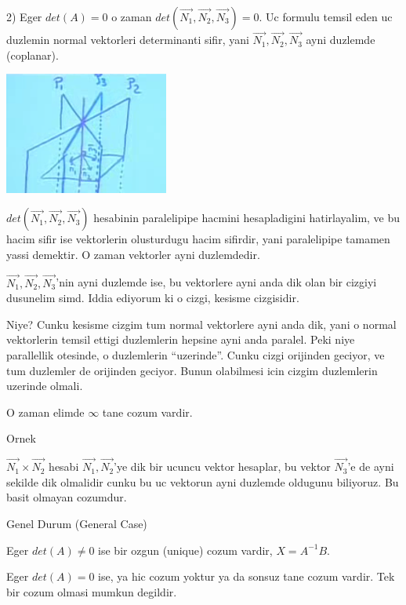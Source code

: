 \documentclass[12pt,fleqn]{article}
\begin{document}
2) Eger $det(A) = 0$ o zaman $det(\vec{N_1},\vec{N_2},\vec{N_3}) = 0$. Uc formulu temsil  
eden uc duzlemin normal vektorleri determinanti sifir, yani
$\vec{N_1},\vec{N_2},\vec{N_3}$ ayni duzlemde (coplanar). 

\includegraphics[height=4cm]{4_5.png}

$det(\vec{N_1},\vec{N_2},\vec{N_3})$ hesabinin paralelipipe hacmini hesapladigini hatirlayalim, ve 
bu hacim sifir ise vektorlerin olusturdugu hacim sifirdir, yani paralelipipe 
tamamen yassi demektir. O zaman vektorler ayni duzlemdedir. 

$\vec{N_1},\vec{N_2},\vec{N_3}$'nin ayni duzlemde ise, bu vektorlere ayni
anda dik olan bir cizgiyi dusunelim simd. Iddia ediyorum ki o cizgi,
kesisme cizgisidir.

Niye? Cunku kesisme cizgim tum normal vektorlere ayni anda dik, yani o
normal vektorlerin temsil ettigi duzlemlerin hepsine ayni anda
paralel. Peki niye parallellik otesinde, o duzlemlerin ``uzerinde''. Cunku
cizgi orijinden geciyor, ve tum duzlemler de orijinden geciyor. Bunun
olabilmesi icin cizgim duzlemlerin uzerinde olmali.

O zaman elimde $\infty$ tane cozum vardir. 

Ornek 

$\vec{N_1} \times \vec{N_2}$ hesabi $\vec{N_1},\vec{N_2}$'ye dik bir ucuncu
vektor hesaplar, bu vektor $\vec{N_3}$'e de ayni sekilde dik olmalidir
cunku bu uc vektorun ayni duzlemde oldugunu biliyoruz. Bu basit olmayan
cozumdur.

Genel Durum (General Case)

Eger $det(A) \ne 0$ ise bir ozgun (unique) cozum vardir, $X = A^{-1}B$. 

Eger $det(A) = 0$ ise, ya hic cozum yoktur ya da sonsuz tane cozum
vardir. Tek bir cozum olmasi mumkun degildir. 
\end{document}
